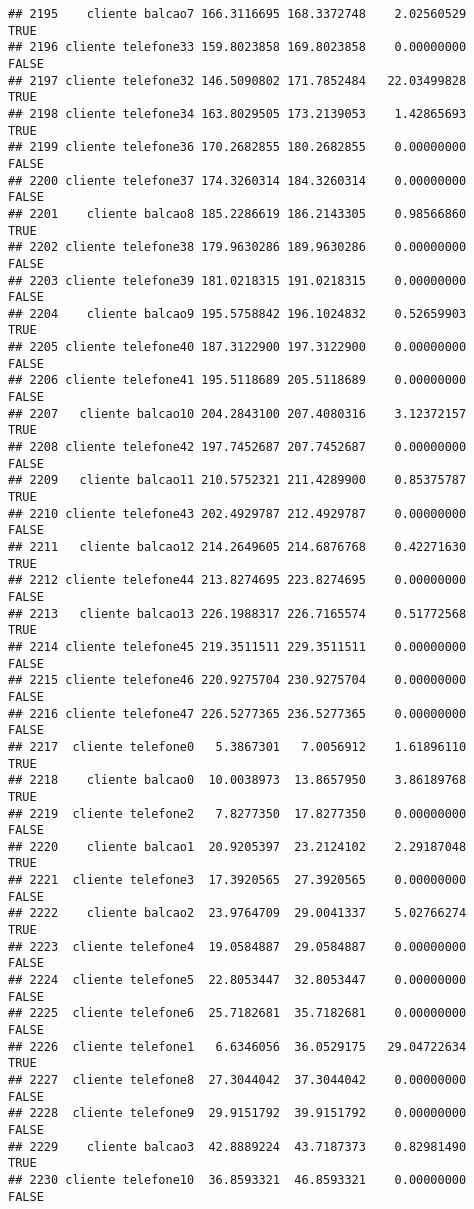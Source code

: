 \documentclass[
]{article}
\begin{document}
\begin{verbatim}
## 2195    cliente balcao7 166.3116695 168.3372748    2.02560529     TRUE
## 2196 cliente telefone33 159.8023858 169.8023858    0.00000000    FALSE
## 2197 cliente telefone32 146.5090802 171.7852484   22.03499828     TRUE
## 2198 cliente telefone34 163.8029505 173.2139053    1.42865693     TRUE
## 2199 cliente telefone36 170.2682855 180.2682855    0.00000000    FALSE
## 2200 cliente telefone37 174.3260314 184.3260314    0.00000000    FALSE
## 2201    cliente balcao8 185.2286619 186.2143305    0.98566860     TRUE
## 2202 cliente telefone38 179.9630286 189.9630286    0.00000000    FALSE
## 2203 cliente telefone39 181.0218315 191.0218315    0.00000000    FALSE
## 2204    cliente balcao9 195.5758842 196.1024832    0.52659903     TRUE
## 2205 cliente telefone40 187.3122900 197.3122900    0.00000000    FALSE
## 2206 cliente telefone41 195.5118689 205.5118689    0.00000000    FALSE
## 2207   cliente balcao10 204.2843100 207.4080316    3.12372157     TRUE
## 2208 cliente telefone42 197.7452687 207.7452687    0.00000000    FALSE
## 2209   cliente balcao11 210.5752321 211.4289900    0.85375787     TRUE
## 2210 cliente telefone43 202.4929787 212.4929787    0.00000000    FALSE
## 2211   cliente balcao12 214.2649605 214.6876768    0.42271630     TRUE
## 2212 cliente telefone44 213.8274695 223.8274695    0.00000000    FALSE
## 2213   cliente balcao13 226.1988317 226.7165574    0.51772568     TRUE
## 2214 cliente telefone45 219.3511511 229.3511511    0.00000000    FALSE
## 2215 cliente telefone46 220.9275704 230.9275704    0.00000000    FALSE
## 2216 cliente telefone47 226.5277365 236.5277365    0.00000000    FALSE
## 2217  cliente telefone0   5.3867301   7.0056912    1.61896110     TRUE
## 2218    cliente balcao0  10.0038973  13.8657950    3.86189768     TRUE
## 2219  cliente telefone2   7.8277350  17.8277350    0.00000000    FALSE
## 2220    cliente balcao1  20.9205397  23.2124102    2.29187048     TRUE
## 2221  cliente telefone3  17.3920565  27.3920565    0.00000000    FALSE
## 2222    cliente balcao2  23.9764709  29.0041337    5.02766274     TRUE
## 2223  cliente telefone4  19.0584887  29.0584887    0.00000000    FALSE
## 2224  cliente telefone5  22.8053447  32.8053447    0.00000000    FALSE
## 2225  cliente telefone6  25.7182681  35.7182681    0.00000000    FALSE
## 2226  cliente telefone1   6.6346056  36.0529175   29.04722634     TRUE
## 2227  cliente telefone8  27.3044042  37.3044042    0.00000000    FALSE
## 2228  cliente telefone9  29.9151792  39.9151792    0.00000000    FALSE
## 2229    cliente balcao3  42.8889224  43.7187373    0.82981490     TRUE
## 2230 cliente telefone10  36.8593321  46.8593321    0.00000000    FALSE

\end{verbatim}
\end{document}
